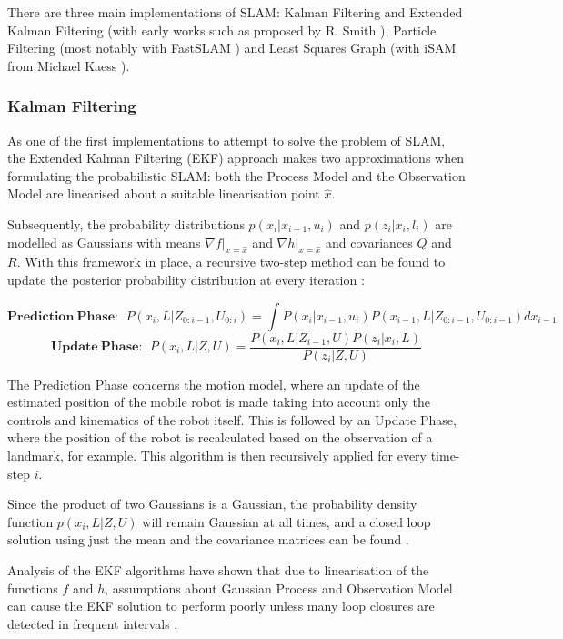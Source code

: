 \documentclass[11pt]{article}
\begin{document}
There are three main implementations of SLAM: Kalman Filtering and Extended Kalman Filtering (with early works such as proposed by R. Smith \cite{Smith:1990:EUS:93002.93291}), Particle Filtering (most notably with FastSLAM \cite{Montemerlo02fastslam:a}) and Least Squares Graph (with iSAM from Michael Kaess \cite{Kaess08tro}).

	\subsubsection{Kalman Filtering}

As one of the first implementations to attempt to solve the problem of SLAM, the Extended Kalman Filtering (EKF) approach makes two approximations when formulating the probabilistic SLAM: both the Process Model and the Observation Model are linearised about a suitable linearisation point $\hat{x}$.

 Subsequently, the probability distributions $p(x_i|x_{i-1}, u_i)$ and $p(z_i|x_i, l_i)$ are modelled as Gaussians with means $\nabla f|_{x=\hat{x}}$ and $\nabla h|_{x=\hat{x}}$ and covariances $Q$ and $R$. With this framework in place, a recursive two-step method can be found to update the posterior probability distribution at every iteration \cite{SLAMPartI}:

\begin{equation*}
\mathbf{Prediction\ Phase:}\ \ 
P(x_{i},L|Z_{0:i-1}, U_{0:i}) = \int P(x_i | x_{i-1}, u_{i}) P(x_{i-1}, L |Z_{0:i-1}, U_{0:i-1})dx_{i-1}
\end{equation*}
\begin{equation*}
\mathbf{Update\ Phase:} \ \  P(x_i, L | Z, U) = \frac{P(x_{i}, L | Z_{i-1}, U)P(z_i|x_i,L)}{P(z_i|Z, U)}
\end{equation*}	 	

The Prediction Phase concerns the motion model, where an update of the estimated position of the mobile robot is made taking into account only the controls and kinematics of the robot itself. This is followed by an Update Phase, where the position of the robot is recalculated based on the observation of a landmark, for example. This algorithm is then recursively applied for every time-step $i$. 	

Since the product of two Gaussians is a Gaussian, the probability density function $p(x_i, L|Z, U)$ will remain Gaussian at all times, and a closed loop solution using just the mean and the covariance matrices can be found \cite{772544}.

Analysis of the EKF algorithms have shown that due to linearisation of the functions $f$ and $h$, assumptions about Gaussian Process and Observation Model can cause the EKF solution to perform poorly unless many loop closures are detected in frequent intervals \cite{doi:10.1177/1729881416669482}.
\end{document}
